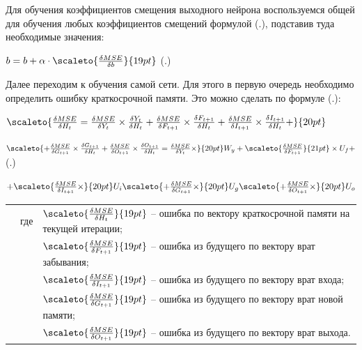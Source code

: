 {  \par \redline Для обучения коэффициентов смещения выходного нейрона воспользуемся общей для обучения любых коэффициентов смещений формулой (\thechaptercntr .\theformulacntr), подставив туда необходимые значения:

  \formulaspace \par \redline 
    $b = b + \alpha \cdot \scaleto{\frac{\delta MSE}{\delta b}}{19pt}$
    \hfill (\thechaptercntr .\theformulacntr) \redline
  \formulaspace \addtocounter{formulacntr}{1}

  \par \redline Далее переходим к обучения самой сети. Для этого в первую очередь необходимо определить ошибку краткосрочной памяти. Это можно сделать по формуле (\thechaptercntr .\theformulacntr):

  \formulaspace 
    \par \redline 
    $\scaleto{\frac{\delta MSE}{\delta H_t} = \frac{\delta MSE}{\delta Y_t} \times \frac{\delta Y_t}{\delta H_t} + \frac{\delta MSE}{\delta F_{t+1}} \times \frac{\delta F_{t+1}}{\delta H_t} + \frac{\delta MSE}{\delta I_{t+1}} \times \frac{\delta I_{t+1}}{\delta H_t} + }{20pt}$
    \par \redline 
    $\scaleto{+ \frac{\delta MSE}{\delta G_{t+1}} \times \frac{\delta G_{t+1}}{\delta H_t} + \frac{\delta MSE}{\delta O_{t+1}} \times \frac{\delta O_{t+1}}{\delta H_t} = \frac{\delta MSE}{\delta Y_t} \times }{20pt} W_y +  \scaleto{\frac{\delta MSE}{\delta F_{t+1}}}{21pt} \times U_f + $
    \hspace{0.475cm} (\thechaptercntr .\theformulacntr) 
    \par \redline 
    $+ \scaleto{\frac{\delta MSE}{\delta I_{t+1}} \times}{20pt} U_i \scaleto{+ \frac{\delta MSE}{\delta G_{t+1}} \times}{20pt} U_g \scaleto{+ \frac{\delta MSE}{\delta O_{t+1}} \times}{20pt} U_o$
    \par
  \formulaspace \addtocounter{formulacntr}{1}

  \begin{tabular}{p{}p{}p{}}
		& где  & $\scaleto{\frac{\delta MSE}{\delta H_t}}{19pt}$ {--} ошибка по вектору краткосрочной памяти на текущей итерации; \\
    &      & $\scaleto{\frac{\delta MSE}{\delta F_{t+1}}}{19pt}$ {--} ошибка из будущего по вектору врат забывания; \\
    &      & $\scaleto{\frac{\delta MSE}{\delta I_{t+1}}}{19pt}$ {--} ошибка из будущего по вектору врат входа; \\
    &      & $\scaleto{\frac{\delta MSE}{\delta G_{t+1}}}{19pt}$ {--} ошибка из будущего по вектору врат новой памяти; \\
    &      & $\scaleto{\frac{\delta MSE}{\delta O_{t+1}}}{19pt}$ {--} ошибка из будущего по вектору врат выхода. \\
  \end{tabular}

}
